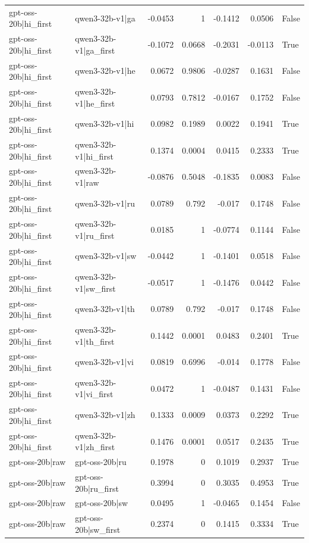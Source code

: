 \begin{table}
\begin{tabular}{l l r r r r l}
gpt-oss-20b|hi_first & qwen3-32b-v1|ga & -0.0453 & 1 & -0.1412 & 0.0506 & False \\
gpt-oss-20b|hi_first & qwen3-32b-v1|ga_first & -0.1072 & 0.0668 & -0.2031 & -0.0113 & True \\
gpt-oss-20b|hi_first & qwen3-32b-v1|he & 0.0672 & 0.9806 & -0.0287 & 0.1631 & False \\
gpt-oss-20b|hi_first & qwen3-32b-v1|he_first & 0.0793 & 0.7812 & -0.0167 & 0.1752 & False \\
gpt-oss-20b|hi_first & qwen3-32b-v1|hi & 0.0982 & 0.1989 & 0.0022 & 0.1941 & True \\
gpt-oss-20b|hi_first & qwen3-32b-v1|hi_first & 0.1374 & 0.0004 & 0.0415 & 0.2333 & True \\
gpt-oss-20b|hi_first & qwen3-32b-v1|raw & -0.0876 & 0.5048 & -0.1835 & 0.0083 & False \\
gpt-oss-20b|hi_first & qwen3-32b-v1|ru & 0.0789 & 0.792 & -0.017 & 0.1748 & False \\
gpt-oss-20b|hi_first & qwen3-32b-v1|ru_first & 0.0185 & 1 & -0.0774 & 0.1144 & False \\
gpt-oss-20b|hi_first & qwen3-32b-v1|sw & -0.0442 & 1 & -0.1401 & 0.0518 & False \\
gpt-oss-20b|hi_first & qwen3-32b-v1|sw_first & -0.0517 & 1 & -0.1476 & 0.0442 & False \\
gpt-oss-20b|hi_first & qwen3-32b-v1|th & 0.0789 & 0.792 & -0.017 & 0.1748 & False \\
gpt-oss-20b|hi_first & qwen3-32b-v1|th_first & 0.1442 & 0.0001 & 0.0483 & 0.2401 & True \\
gpt-oss-20b|hi_first & qwen3-32b-v1|vi & 0.0819 & 0.6996 & -0.014 & 0.1778 & False \\
gpt-oss-20b|hi_first & qwen3-32b-v1|vi_first & 0.0472 & 1 & -0.0487 & 0.1431 & False \\
gpt-oss-20b|hi_first & qwen3-32b-v1|zh & 0.1333 & 0.0009 & 0.0373 & 0.2292 & True \\
gpt-oss-20b|hi_first & qwen3-32b-v1|zh_first & 0.1476 & 0.0001 & 0.0517 & 0.2435 & True \\
gpt-oss-20b|raw & gpt-oss-20b|ru & 0.1978 & 0 & 0.1019 & 0.2937 & True \\
gpt-oss-20b|raw & gpt-oss-20b|ru_first & 0.3994 & 0 & 0.3035 & 0.4953 & True \\
gpt-oss-20b|raw & gpt-oss-20b|sw & 0.0495 & 1 & -0.0465 & 0.1454 & False \\
gpt-oss-20b|raw & gpt-oss-20b|sw_first & 0.2374 & 0 & 0.1415 & 0.3334 & True \\

\end{tabular}
\end{table}
